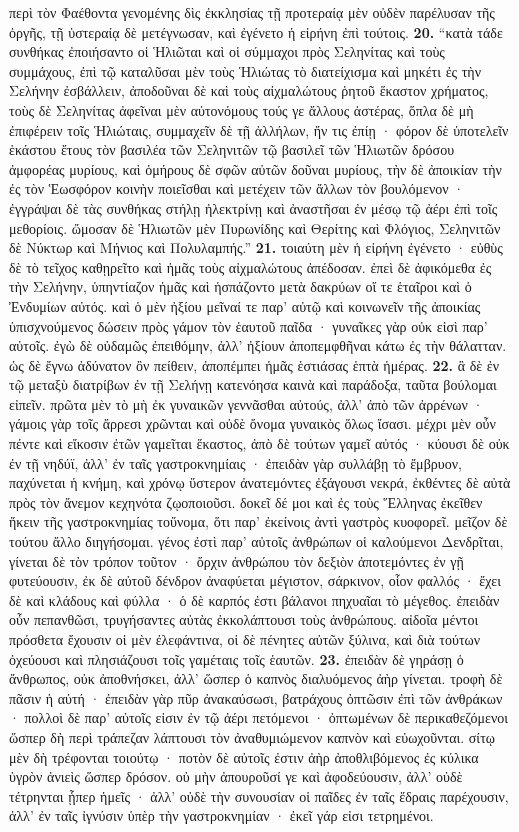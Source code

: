 \documentclass[a4paper, 11pt, oneside, polutonikogreek, german]{article}
\begin{document}
περὶ τὸν Φαέθοντα γενομένης δὶς ἐκκλησίας τῇ προτεραίᾳ μὲν οὐδὲν παρέλυσαν τῆς ὀργῆς, τῇ ὑστεραίᾳ δὲ μετέγνωσαν, καὶ ἐγένετο ἡ εἰρήνη ἐπὶ τούτοις. \textbf{20.} "`κατὰ τάδε συνθήκας ἐποιήσαντο οἱ Ἡλιῶται καὶ οἱ σύμμαχοι πρὸς Σεληνίτας καὶ τοὺς συμμάχους, ἐπὶ τῷ καταλῦσαι μὲν τοὺς Ἡλιώτας τὸ διατείχισμα καὶ μηκέτι ἐς τὴν Σελήνην ἐσβάλλειν, ἀποδοῦναι δὲ καὶ τοὺς αἰχμαλώτους ῥητοῦ ἕκαστον χρήματος, τοὺς δὲ Σεληνίτας ἀφεῖναι μὲν αὐτονόμους τούς γε ἄλλους ἀστέρας, ὅπλα δὲ μὴ ἐπιφέρειν τοῖς Ἡλιώταις, συμμαχεῖν δὲ τῇ ἀλλήλων, ἤν τις ἐπίῃ · φόρον δὲ ὑποτελεῖν ἑκάστου ἔτους τὸν βασιλέα τῶν Σεληνιτῶν τῷ βασιλεῖ τῶν Ἡλιωτῶν δρόσου ἀμφορέας μυρίους, καὶ ὁμήρους δὲ σφῶν αὐτῶν δοῦναι μυρίους, τὴν δὲ ἀποικίαν τὴν ἐς τὸν Ἑωσφόρον κοινὴν ποιεῖσθαι καὶ μετέχειν τῶν ἄλλων τὸν βουλόμενον · ἐγγράψαι δὲ τὰς συνθήκας στήλῃ ἠλεκτρίνῃ καὶ ἀναστῆσαι ἐν μέσῳ τῷ ἀέρι ἐπὶ τοῖς μεθορίοις. ὤμοσαν δὲ Ἡλιωτῶν μὲν Πυρωνίδης καὶ Θερίτης καὶ Φλόγιος, Σεληνιτῶν δὲ Νύκτωρ καὶ Μήνιος καὶ Πολυλαμπής."' \textbf{21.} τοιαύτη μὲν ἡ εἰρήνη ἐγένετο · εὐθὺς δὲ τὸ τεῖχος καθῃρεῖτο καὶ ἡμᾶς τοὺς αἰχμαλώτους ἀπέδοσαν. ἐπεὶ δὲ ἀφικόμεθα ἐς τὴν Σελήνην, ὑπηντίαζον ἡμᾶς καὶ ἡσπάζοντο μετὰ δακρύων οἵ τε ἑταῖροι καὶ ὁ Ἐνδυμίων αὐτός. καὶ ὁ μὲν ἠξίου μεῖναί τε παρ' αὐτῷ καὶ κοινωνεῖν τῆς ἀποικίας ὑπισχνούμενος δώσειν πρὸς γάμον τὸν ἑαυτοῦ παῖδα · γυναῖκες γὰρ οὐκ εἰσὶ παρ' αὐτοῖς. ἐγὼ δὲ οὐδαμῶς ἐπειθόμην, ἀλλ' ἠξίουν ἀποπεμφθῆναι κάτω ἐς τὴν θάλατταν. ὡς δὲ ἔγνω ἀδύνατον ὂν πείθειν, ἀποπέμπει ἡμᾶς ἑστιάσας ἑπτὰ ἡμέρας. \textbf{22.} ἃ δὲ ἐν τῷ μεταξὺ διατρίβων ἐν τῇ Σελήνῃ κατενόησα καινὰ καὶ παράδοξα, ταῦτα βούλομαι εἰπεῖν. πρῶτα μὲν τὸ μὴ ἐκ γυναικῶν γεννᾶσθαι αὐτούς, ἀλλ' ἀπὸ τῶν ἀρρένων · γάμοις γὰρ τοῖς ἄρρεσι χρῶνται καὶ οὐδὲ ὄνομα γυναικὸς ὅλως ἴσασι. μέχρι μὲν οὖν πέντε καὶ εἴκοσιν ἐτῶν γαμεῖται ἕκαστος, ἀπὸ δὲ τούτων γαμεῖ αὐτός · κύουσι δὲ οὐκ ἐν τῇ νηδύϊ, ἀλλ' ἐν ταῖς γαστροκνημίαις · ἐπειδὰν γὰρ συλλάβῃ τὸ ἔμβρυον, παχύνεται ἡ κνήμη, καὶ χρόνῳ ὕστερον ἀνατεμόντες ἐξάγουσι νεκρά, ἐκθέντες δὲ αὐτὰ πρὸς τὸν ἄνεμον κεχηνότα ζῳοποιοῦσι. δοκεῖ δέ μοι καὶ ἐς τοὺς Ἕλληνας ἐκεῖθεν ἥκειν τῆς γαστροκνημίας τοὔνομα, ὅτι παρ' ἐκείνοις ἀντὶ γαστρὸς κυοφορεῖ. μεῖζον δὲ τούτου ἄλλο διηγήσομαι. γένος ἐστὶ παρ' αὐτοῖς ἀνθρώπων οἱ καλούμενοι Δενδρῖται, γίνεται δὲ τὸν τρόπον τοῦτον · ὄρχιν ἀνθρώπου τὸν δεξιὸν ἀποτεμόντες ἐν γῇ φυτεύουσιν, ἐκ δὲ αὐτοῦ δένδρον ἀναφύεται μέγιστον, σάρκινον, οἷον φαλλός · ἔχει δὲ καὶ κλάδους καὶ φύλλα · ὁ δὲ καρπός ἐστι βάλανοι πηχυαῖαι τὸ μέγεθος. ἐπειδὰν οὖν πεπανθῶσι, τρυγήσαντες αὐτὰς ἐκκολάπτουσι τοὺς ἀνθρώπους. αἰδοῖα μέντοι πρόσθετα ἔχουσιν οἱ μὲν ἐλεφάντινα, οἱ δὲ πένητες αὐτῶν ξύλινα, καὶ διὰ τούτων ὀχεύουσι καὶ πλησιάζουσι τοῖς γαμέταις τοῖς ἑαυτῶν. \textbf{23.} ἐπειδὰν δὲ γηράσῃ ὁ ἄνθρωπος, οὐκ ἀποθνήσκει, ἀλλ' ὥσπερ ὁ καπνὸς διαλυόμενος ἀὴρ γίνεται. τροφὴ δὲ πᾶσιν ἡ αὐτή · ἐπειδὰν γὰρ πῦρ ἀνακαύσωσι, βατράχους ὀπτῶσιν ἐπὶ τῶν ἀνθράκων · πολλοὶ δὲ παρ' αὐτοῖς εἰσιν ἐν τῷ ἀέρι πετόμενοι · ὀπτωμένων δὲ περικαθεζόμενοι ὥσπερ δὴ περὶ τράπεζαν λάπτουσι τὸν ἀναθυμιώμενον καπνὸν καὶ εὐωχοῦνται. σίτῳ μὲν δὴ τρέφονται τοιούτῳ · ποτὸν δὲ αὐτοῖς ἐστιν ἀὴρ ἀποθλιβόμενος ἐς κύλικα ὑγρὸν ἀνιεὶς ὥσπερ δρόσον. οὐ μὴν ἀπουροῦσί γε καὶ ἀφοδεύουσιν, ἀλλ' οὐδὲ τέτρηνται ᾗπερ ἡμεῖς · ἀλλ' οὐδὲ τὴν συνουσίαν οἱ παῖδες ἐν ταῖς ἕδραις παρέχουσιν, ἀλλ' ἐν ταῖς ἰγνύσιν ὑπὲρ τὴν γαστροκνημίαν · ἐκεῖ γάρ εἰσι τετρημένοι. 
\end{document}
